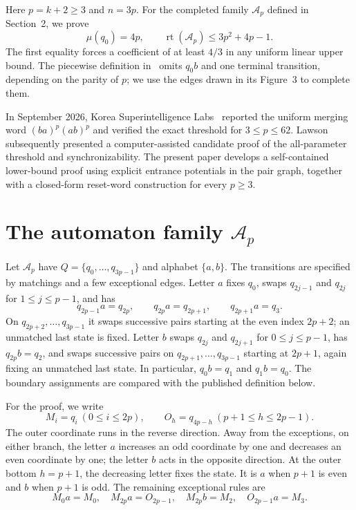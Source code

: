 \documentclass[11pt]{article}
\newcommand{\M}[1]{M_{#1}}
\newcommand{\Ost}[1]{O_{#1}}
\begin{document}
Here $p=k+2\geq3$ and $n=3p$. For the completed family $\mathcal A_p$ defined in Section~2, we prove
\[
 \mu(q_0)=4p,\qquad
 \operatorname{rt}(\mathcal A_p)\leq3p^2+4p-1.
\]
The first equality forces a coefficient of at least $4/3$ in any uniform linear upper bound. The piecewise definition in~\cite{szykula} omits $q_0b$ and one terminal transition, depending on the parity of $p$; we use the edges drawn in its Figure~3 to complete them.

In September 2026, Korea Superintelligence Labs~\cite{machina} reported the uniform merging word $(ba)^p(ab)^p$ and verified the exact threshold for $3\leq p\leq62$. Lawson~\cite{modal30} subsequently presented a computer-assisted candidate proof of the all-parameter threshold and synchronizability. The present paper develops a self-contained lower-bound proof using explicit entrance potentials in the pair graph, together with a closed-form reset-word construction for every $p\geq3$.

\section[The automaton family]{The automaton family $\mathcal A_p$}
Let $\mathcal A_p$ have $Q=\{q_0,\ldots,q_{3p-1}\}$ and alphabet $\{a,b\}$. The transitions are specified by matchings and a few exceptional edges. Letter $a$ fixes $q_0$, swaps $q_{2j-1}$ and $q_{2j}$ for $1\leq j\leq p-1$, and has
\[
 q_{2p-1}a=q_{2p},\qquad q_{2p}a=q_{2p+1},\qquad q_{2p+1}a=q_3.
\]
On $q_{2p+2},\ldots,q_{3p-1}$ it swaps successive pairs starting at the even index $2p+2$; an unmatched last state is fixed. Letter $b$ swaps $q_{2j}$ and $q_{2j+1}$ for $0\leq j\leq p-1$, has $q_{2p}b=q_2$, and swaps successive pairs on $q_{2p+1},\ldots,q_{3p-1}$ starting at $2p+1$, again fixing an unmatched last state. In particular, $q_0b=q_1$ and $q_1b=q_0$. The boundary assignments are compared with the published definition below.

For the proof, we write
\[
 \M i=q_i\ (0\leq i\leq2p),\qquad
 \Ost h=q_{4p-h}\ (p+1\leq h\leq2p-1).
\]
The outer coordinate runs in the reverse direction. Away from the exceptions, on either branch, the letter $a$ increases an odd coordinate by one and decreases an even coordinate by one; the letter $b$ acts in the opposite direction. At the outer bottom $h=p+1$, the decreasing letter fixes the state. It is $a$ when $p+1$ is even and $b$ when $p+1$ is odd. The remaining exceptional rules are
\begin{equation}\label{eq:exceptions}
 \M0a=\M0,\quad \M{2p}a=\Ost{2p-1},\quad
 \M{2p}b=\M2,\quad \Ost{2p-1}a=\M3.
\end{equation}
\end{document}
